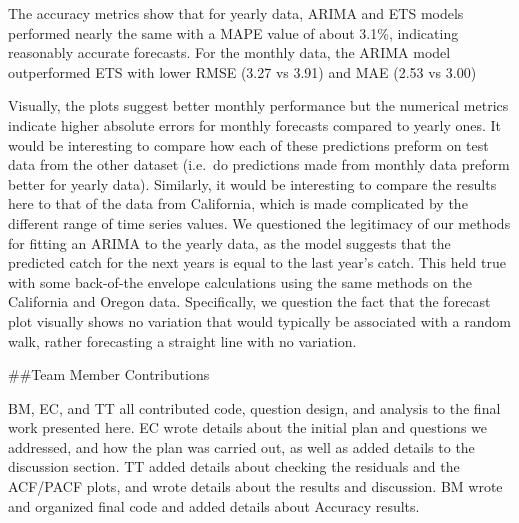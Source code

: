 \documentclass[
]{article}
\begin{document}
The accuracy metrics show that for yearly data, ARIMA and ETS models
performed nearly the same with a MAPE value of about 3.1\%, indicating
reasonably accurate forecasts. For the monthly data, the ARIMA model
outperformed ETS with lower RMSE (3.27 vs 3.91) and MAE (2.53 vs 3.00)

Visually, the plots suggest better monthly performance but the numerical
metrics indicate higher absolute errors for monthly forecasts compared
to yearly ones. It would be interesting to compare how each of these
predictions preform on test data from the other dataset (i.e.~do
predictions made from monthly data preform better for yearly data).
Similarly, it would be interesting to compare the results here to that
of the data from California, which is made complicated by the different
range of time series values. We questioned the legitimacy of our methods
for fitting an ARIMA to the yearly data, as the model suggests that the
predicted catch for the next years is equal to the last year's catch.
This held true with some back-of-the envelope calculations using the
same methods on the California and Oregon data. Specifically, we
question the fact that the forecast plot visually shows no variation
that would typically be associated with a random walk, rather
forecasting a straight line with no variation.

\#\#Team Member Contributions

BM, EC, and TT all contributed code, question design, and analysis to
the final work presented here. EC wrote details about the initial plan
and questions we addressed, and how the plan was carried out, as well as
added details to the discussion section. TT added details about checking
the residuals and the ACF/PACF plots, and wrote details about the
results and discussion. BM wrote and organized final code and added
details about Accuracy results.
\end{document}
